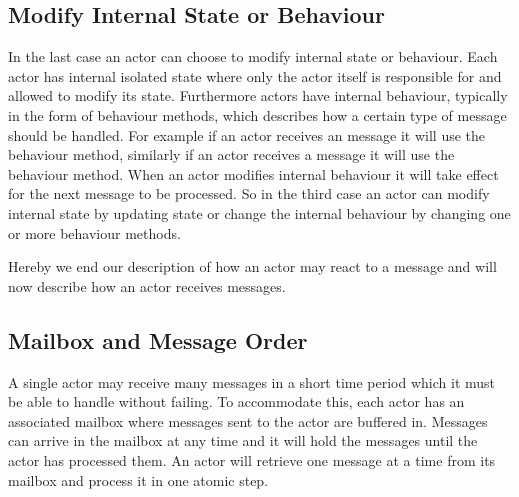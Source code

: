 \subsection{Modify Internal State or Behaviour}
In the last case an actor can choose to modify internal state or behaviour. Each actor has internal isolated state where only the actor itself is responsible for and allowed to modify its state. Furthermore actors have internal behaviour, typically in the form of behaviour methods, which describes how a certain type of message should be handled. For example if an actor receives an  message it will use the  behaviour method, similarly  if an actor receives a  message it will use the  behaviour method. When an actor modifies internal behaviour it will take effect for the next message to be processed. So in the third case an actor can modify internal state by updating state or change the internal behaviour by changing one or more behaviour methods. 

Hereby we end our description of how an actor may react to a message and will now describe how an actor receives messages.

\subsection{Mailbox and Message Order}\label{ssec:mailbox_and_message_order}
A single actor may receive many messages in a short time period which it must be able to handle without failing. To accommodate this, each actor has an associated mailbox where messages sent to the actor are buffered in\cite[Chap. 2.6]{haller2012actors}. Messages can arrive in the mailbox at any time and it will hold the messages until the actor has processed them. An actor will retrieve one message at a time from its mailbox and process it in one atomic step\cite[p. 2]{karmani2009actor}.

